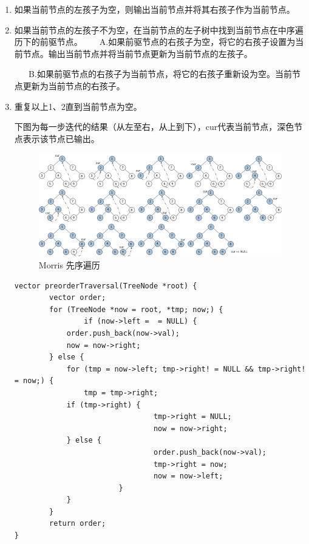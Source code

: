 \documentclass[12pt]{book}
\begin{document}
\begin{enumerate}
\item 如果当前节点的左孩子为空，则输出当前节点并将其右孩子作为当前节点。
\label{sec-4-1-2-1}
\item 如果当前节点的左孩子不为空，在当前节点的左子树中找到当前节点在中序遍历下的前驱节点。
\label{sec-4-1-2-2}
~ ~ A.如果前驱节点的右孩子为空，将它的右孩子设置为当前节点。输出当前节点并将当前节点更新为当前节点的左孩子。

~ ~ B.如果前驱节点的右孩子为当前节点，将它的右孩子重新设为空。当前节点更新为当前节点的右孩子。
\item 重复以上1、2直到当前节点为空。
\label{sec-4-1-2-3}

下图为每一步迭代的结果（从左至右，从上到下），cur代表当前节点，深色节
点表示该节点已输出。

\begin{figure}[htb]
\centering
\includegraphics[width=.9\linewidth]{./pic/morrPre.jpg}
\caption{Morris 先序遍历}
\end{figure}

\lstset{language=java,label= ,caption= ,numbers=none}
\begin{lstlisting}
vector preorderTraversal(TreeNode *root) {
        vector order;
        for (TreeNode *now = root, *tmp; now;) {
                if (now->left =  = NULL) {
            order.push_back(now->val);
            now = now->right;   
        } else {
            for (tmp = now->left; tmp->right! = NULL && tmp->right! = now;) {
                tmp = tmp->right;
            if (tmp->right) {
                                tmp->right = NULL;
                                now = now->right;
            } else {
                                order.push_back(now->val);
                                tmp->right = now;
                                now = now->left;
                        }
            }
        }
        return order;
}
\end{lstlisting}
\end{enumerate}
\end{document}
